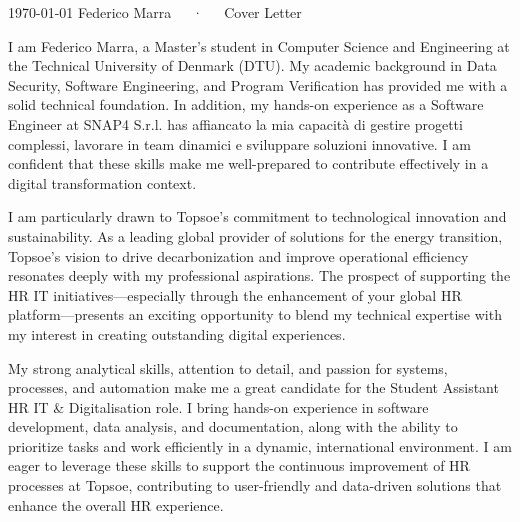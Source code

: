 \documentclass[11pt, a4paper]{awesome-cv}
\begin{document}
\makecvheader[R]

\makecvfooter
  {\today}
  {Federico Marra~~~·~~~Cover Letter}
  {}

\makelettertitle

\begin{cvletter}

I am Federico Marra, a Master’s student in Computer Science and Engineering at the Technical University of Denmark (DTU). My academic background in Data Security, Software Engineering, and Program Verification has provided me with a solid technical foundation. In addition, my hands-on experience as a Software Engineer at SNAP4 S.r.l. has affiancato la mia capacità di gestire progetti complessi, lavorare in team dinamici e sviluppare soluzioni innovative. I am confident that these skills make me well-prepared to contribute effectively in a digital transformation context.

I am particularly drawn to Topsoe’s commitment to technological innovation and sustainability. As a leading global provider of solutions for the energy transition, Topsoe’s vision to drive decarbonization and improve operational efficiency resonates deeply with my professional aspirations. The prospect of supporting the HR IT initiatives—especially through the enhancement of your global HR platform—presents an exciting opportunity to blend my technical expertise with my interest in creating outstanding digital experiences.

My strong analytical skills, attention to detail, and passion for systems, processes, and automation make me a great candidate for the Student Assistant HR IT \& Digitalisation role. I bring hands-on experience in software development, data analysis, and documentation, along with the ability to prioritize tasks and work efficiently in a dynamic, international environment. I am eager to leverage these skills to support the continuous improvement of HR processes at Topsoe, contributing to user-friendly and data-driven solutions that enhance the overall HR experience.

\end{cvletter}

\makeletterclosing
\end{document}
